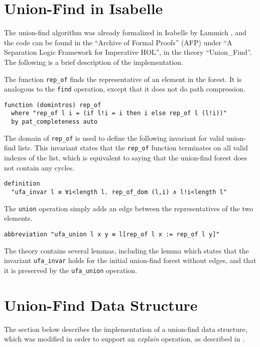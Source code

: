 \section{Union-Find in Isabelle}
\label{section:uf-isabelle}

The union-find algorithm was already formalized in Isabelle by Lammich \cite{unionfind-isabelle}, and the code can be found in the ``Archive of Formal Proofs'' (AFP) under ``A Separation Logic Framework for Imperative HOL'', in the theory ``Union\_Find''\cite{afp, Sep}. The following is a brief description of the implementation.

The function \lstinline{rep_of} finds the representative of an element in the forest. It is analogous to the \lstinline{find} operation, except that it does not do path compression.

\begin{lstlisting}
function (domintros) rep_of
  where "rep_of l i = (if l!i = i then i else rep_of l (l!i))"
  by pat_completeness auto
\end{lstlisting}

The domain of \lstinline{rep_of} is used to define the following invariant for valid union-find lists. This invariant states that the \lstinline{rep_of} function terminates on all valid indexes of the list, which is equivalent to saying that the union-find forest does not contain any cycles.

\begin{lstlisting}
definition
  "ufa_invar l ≡ ∀i<length l. rep_of_dom (l,i) ∧ l!i<length l"
\end{lstlisting}

The \lstinline{union} operation simply adds an edge between the representatives of the two elements.

\begin{lstlisting}
abbreviation "ufa_union l x y ≡ l[rep_of l x := rep_of l y]"
\end{lstlisting}

The theory contains several lemmas, including the lemma which states that the invariant \lstinline{ufa_invar} holds for the initial union-find forest without edges, and that it is preserved by the \lstinline{ufa_union} operation.

\section{Union-Find Data Structure}
\label{section:uf-data}

The section below describes the implementation of a union-find data structure, which was modified in order to support an \emph{explain} operation, as described in \cite{Nieuwenhuis}.


